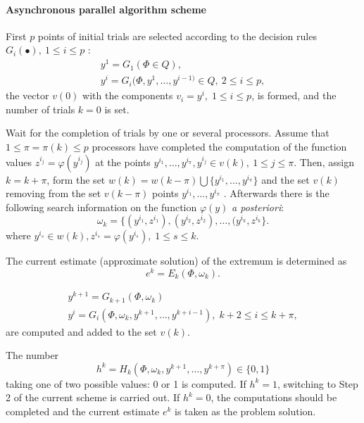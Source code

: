 \paragraph{Asynchronous parallel algorithm scheme}
\begin{description}
\item[\textbf{Step 1}]{First $p$ points of initial trials are selected according to the decision rules $G_i(\bullet ),\ 1\leq i\leq p$ :  
\begin{equation}
\label{eq:26}
\begin{gathered}
y^1=G_1(\Phi\in Q), \\
y^i=G_i(\Phi,y^1,\ldots,y^{i-1)}\in Q,\ 2\leq i\leq p,
\end{gathered}
\end{equation}
the vector $v(0)$  with the components $v_i=y^i,\;1\leq i\leq p$, is formed, and the number of trials $k=0$ is set.}
\item[\textbf{Step 2}]{Wait for the completion of trials by one or several processors. Assume that $1\leq \pi=\pi(k)\leq p$  processors have completed the computation of the function values $z^{i_j}=\varphi(y^{i_j})$  at the points $y^{i_1},\ldots,y^{i_\pi}, y^{i_j}\in v(k),\ 1\leq j\leq \pi$. Then, assign $k=k+\pi$, form the set $w(k)=w(k-\pi)\bigcup \{y^{i_1},\ldots,y^{i_\pi}\}$  and the set $v(k)$ removing from the set $v(k-\pi)$  points $y^{i_1},\ldots,y^{i_\pi}$ . Afterwards there is the following search information on the function $\varphi(y)$ \textit{a posteriori}:
\begin{equation}
\label{eq:27}
\omega_k=\{(y^{i_1},z^{i_1}),(y^{i_2},z^{i_2}),\ldots ,(y^{i_k},z^{i_k}\}.
\end{equation}
where  $y^{i_s}\in w(k),z^{i_s}=\varphi(y^{i_s}),\;1\leq s\leq k$.
}
\item[\textbf{Step 3}]{The current estimate (approximate solution) of the extremum is determined as  
\begin{equation}
\label{eq:28}
e^k=E_k(\Phi,\omega_k).
\end{equation}
}
\item[\textbf{Step 4}]{
\begin{equation}
\label{eq:29}
\begin{gathered}
y^{k+1}=G_{k+1}(\Phi,\omega_{k}) \\
y^i=G_i(\Phi,\omega_k,y^{k+1},\ldots,y^{k+i-1}),\;k+2\leq i\leq k+\pi,
\end{gathered}
\end{equation}
are computed and added to the set $v(k)$.} 
\item[\textbf{Step 5}]{The number 
\begin{equation}
\label{eq:30}
h^k=H_k(\Phi,\omega_k,y^{k+1},\ldots,y^{k+\pi})\in \{0,1\}
\end{equation}
taking one of two possible values: 0 or 1 is computed. If $h^k=1$, switching to Step 2 of the current scheme is carried out. If $h^k=0$, the computations should be completed and the current estimate $e^k$  is taken as the problem solution.}
\end{description}


